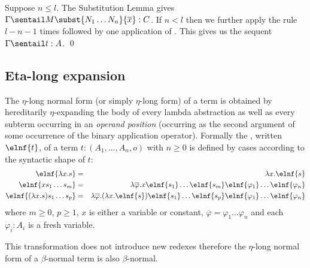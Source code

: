 Suppose $n \leq l$. The Substitution Lemma gives $\Gamma \sentail
M\subst{N_1 \ldots N_n}{\overline{x}} : C$. If $n<l$ then we further apply the rule  $l-n-1$ times followed by one application of
. This gives us the sequent $\Gamma \sentail t :A$.
  \qed

\subsection*{Eta-long expansion}

The $\eta$-long normal form (or simply $\eta$-long form) of a term
is obtained by hereditarily $\eta$-expanding the body of every
lambda abstraction as well as every subterm occurring in an
\emph{operand position} (\ie occurring as the second argument of
some occurrence of the binary application operator). Formally the
, written $\elnf{t}$, of a term $t:
(A_1,\ldots,A_n,o)$ with $n \geq 0$ is defined by cases according to
the syntactic shape of $t$:
\begin{eqnarray*}
  \elnf{\lambda x . s } &=& \lambda x . \elnf{s} \\
  \elnf{x s_1 \ldots s_m } &=& \lambda \overline{\varphi} . x \elnf{s_1}\ldots \elnf{s_m} \elnf{\varphi_1} \ldots \elnf{\varphi_n} \\
  \elnf{(\lambda x . s) s_1 \ldots s_p } &=& \lambda \overline{\varphi} . (\lambda x . \elnf{s}) \elnf{s_1} \ldots \elnf{s_p} \elnf{\varphi_1} \ldots \elnf{\varphi_n}
\end{eqnarray*}
where $m \geq 0$, $p\geq 1$, $x$ is either a variable or constant, $\overline{\varphi} = \varphi_1 \ldots \varphi_n$ and each $\varphi_i : A_i$ is a fresh variable.

\begin{remark}
  This transformation does not introduce
  new redexes therefore the $\eta$-long normal form of a $\beta$-normal
  term is also $\beta$-normal.
\end{remark}

